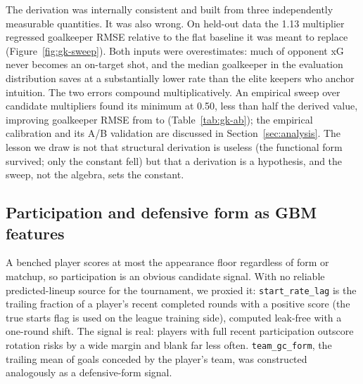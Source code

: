 The derivation was internally consistent and built from three
independently measurable quantities. It was also wrong. On held-out
data the 1.13 multiplier regressed goalkeeper RMSE relative to the
flat baseline it was meant to replace
(Figure~\ref{fig:gk-sweep}). Both inputs were overestimates: much of
opponent xG never becomes an on-target shot, and the median
goalkeeper in the evaluation distribution saves at a substantially
lower rate than the elite keepers who anchor intuition. The two
errors compound multiplicatively. An empirical sweep over candidate
multipliers found its minimum at 0.50, less than half the derived
value, improving goalkeeper RMSE from \GkRmseVOne{} to \GkRmseVTwo{}
(Table~\ref{tab:gk-ab}); the empirical calibration and its A/B
validation are discussed in Section~\ref{sec:analysis}. The lesson we
draw is not that structural derivation is useless (the functional
form survived; only the constant fell) but that a derivation is a
hypothesis, and the sweep, not the algebra, sets the constant.

\subsection{Participation and defensive form as GBM features}
\label{sec:negative-minutes}

A benched player scores at most the appearance floor regardless of
form or matchup, so participation is an obvious candidate signal.
With no reliable predicted-lineup source for the tournament, we
proxied it: \texttt{start\_rate\_lag} is the trailing fraction of a
player's recent completed rounds with a positive score (the true
starts flag is used on the league training side), computed leak-free
with a one-round shift. The signal is real: players with full recent
participation outscore rotation risks by a wide margin and blank far
less often. \texttt{team\_gc\_form}, the trailing mean of goals
conceded by the player's team, was constructed analogously as a
defensive-form signal.

